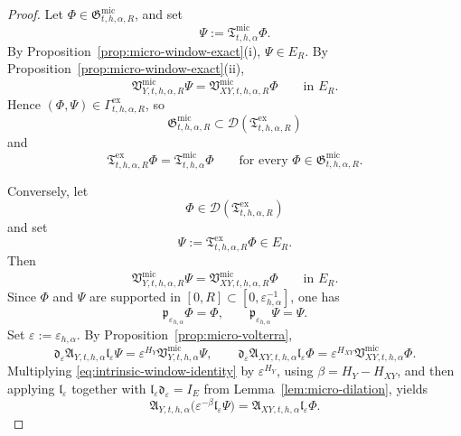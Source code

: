\documentclass[11pt,a4paper]{amsart}
\theoremstyle{plain}
\theoremstyle{definition}
\theoremstyle{remark}
\begin{document}
\begin{proof}
Let \(\Phi\in\mathfrak G_{t,h,\alpha,R}^{\mathrm{mic}}\), and set
\[
\Psi:=\mathfrak T_{t,h,\alpha}^{\mathrm{mic}}\Phi.
\]
By Proposition~\ref{prop:micro-window-exact}(i), \(\Psi\in E_R\). By
Proposition~\ref{prop:micro-window-exact}(ii),
\[
\mathfrak V_{Y,t,h,\alpha,R}^{\mathrm{mic}}\Psi
=
\mathfrak V_{XY,t,h,\alpha,R}^{\mathrm{mic}}\Phi
\qquad\text{in }E_R.
\]
Hence \((\Phi,\Psi)\in \Gamma_{t,h,\alpha,R}^{\mathrm{ex}}\), so
\[
\mathfrak G_{t,h,\alpha,R}^{\mathrm{mic}}
\subset
\mathcal D(\mathfrak T_{t,h,\alpha,R}^{\mathrm{ex}})
\]
and
\[
\mathfrak T_{t,h,\alpha,R}^{\mathrm{ex}}\Phi
=
\mathfrak T_{t,h,\alpha}^{\mathrm{mic}}\Phi
\qquad\text{for every }\Phi\in \mathfrak G_{t,h,\alpha,R}^{\mathrm{mic}}.
\]

Conversely, let
\[
\Phi\in\mathcal D(\mathfrak T_{t,h,\alpha,R}^{\mathrm{ex}})
\]
and set
\[
\Psi:=\mathfrak T_{t,h,\alpha,R}^{\mathrm{ex}}\Phi\in E_R.
\]
Then
\begin{equation}\label{eq:intrinsic-window-identity}
\mathfrak V_{Y,t,h,\alpha,R}^{\mathrm{mic}}\Psi
=
\mathfrak V_{XY,t,h,\alpha,R}^{\mathrm{mic}}\Phi
\qquad\text{in }E_R.
\end{equation}
Since \(\Phi\) and \(\Psi\) are supported in \([0,R]\subset[0,\varepsilon_{h,\alpha}^{-1}]\), one
has
\[
\mathfrak p_{\varepsilon_{h,\alpha}}\Phi=\Phi,
\qquad
\mathfrak p_{\varepsilon_{h,\alpha}}\Psi=\Psi.
\]
Set \(\varepsilon:=\varepsilon_{h,\alpha}\). By Proposition~\ref{prop:micro-volterra},
\[
\mathfrak d_{\varepsilon}
\mathfrak A_{Y,t,h,\alpha}
\mathfrak l_{\varepsilon}\Psi
=
\varepsilon^{H_Y}
\mathfrak V_{Y,t,h,\alpha}^{\mathrm{mic}}\Psi,
\qquad
\mathfrak d_{\varepsilon}
\mathfrak A_{XY,t,h,\alpha}
\mathfrak l_{\varepsilon}\Phi
=
\varepsilon^{H_{XY}}
\mathfrak V_{XY,t,h,\alpha}^{\mathrm{mic}}\Phi.
\]
Multiplying \eqref{eq:intrinsic-window-identity} by \(\varepsilon^{H_Y}\), using
\(\beta=H_Y-H_{XY}\), and then applying \(\mathfrak l_{\varepsilon}\) together with
\(\mathfrak l_{\varepsilon}\mathfrak d_{\varepsilon}=I_E\) from
Lemma~\ref{lem:micro-dilation}, yields
\begin{equation}\label{eq:intrinsic-window-local}
\mathfrak A_{Y,t,h,\alpha}
\bigl(
\varepsilon^{-\beta}\mathfrak l_{\varepsilon}\Psi
\bigr)
=
\mathfrak A_{XY,t,h,\alpha}\mathfrak l_{\varepsilon}\Phi.
\end{equation}


\end{proof}
\end{document}
